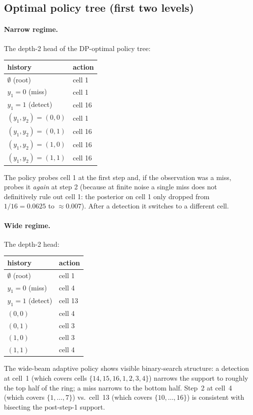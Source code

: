 \documentclass[11pt,a4paper]{article}
\begin{document}
\subsection{Optimal policy tree (first two levels)}

\paragraph{Narrow regime.}  The depth-2 head of the DP-optimal policy tree:
\begin{center}
\begin{tabular}{@{}ll@{}}
\toprule
history  & action \\
\midrule
$\emptyset$ (root) & cell 1 \\
$y_1 = 0$ (miss)      & cell 1 \\
$y_1 = 1$ (detect)    & cell 16 \\
$(y_1, y_2) = (0, 0)$ & cell 1 \\
$(y_1, y_2) = (0, 1)$ & cell 16 \\
$(y_1, y_2) = (1, 0)$ & cell 16 \\
$(y_1, y_2) = (1, 1)$ & cell 16 \\
\bottomrule
\end{tabular}
\end{center}
The policy probes cell 1 at the first step and, if the observation was a miss, probes it \emph{again} at step 2 (because at finite noise a single miss does not definitively rule out cell 1: the posterior on cell 1 only dropped from $1/16 = 0.0625$ to $\approx 0.007$).  After a detection it switches to a different cell.

\paragraph{Wide regime.}  The depth-2 head:
\begin{center}
\begin{tabular}{@{}ll@{}}
\toprule
history & action \\
\midrule
$\emptyset$ (root)  & cell 1 \\
$y_1 = 0$ (miss)    & cell 4 \\
$y_1 = 1$ (detect)  & cell 13 \\
$(0, 0)$            & cell 4 \\
$(0, 1)$            & cell 3 \\
$(1, 0)$            & cell 3 \\
$(1, 1)$            & cell 4 \\
\bottomrule
\end{tabular}
\end{center}
The wide-beam adaptive policy shows visible binary-search structure: a detection at cell~1 (which covers cells $\{14, 15, 16, 1, 2, 3, 4\}$) narrows the support to roughly the top half of the ring; a miss narrows to the bottom half.  Step~2 at cell~4 (which covers $\{1, \ldots, 7\}$) vs.\ cell~13 (which covers $\{10, \ldots, 16\}$) is consistent with bisecting the post-step-1 support.
\end{document}
